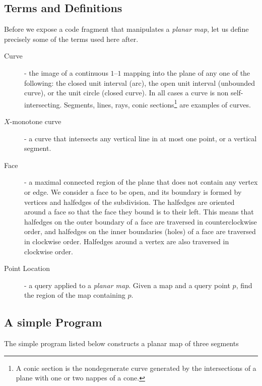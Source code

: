 \subsection{Terms and Definitions}
Before we expose a code fragment that manipulates a {\em planar
map}, let us define precisely some of the terms used here after.

\begin{description}
\item[Curve] - the image of a continuous $1$--$1$ mapping into the
plane of any one of the following: the closed unit interval (arc), the
open unit interval (unbounded curve), or the unit circle (closed
curve). In all cases a curve is non self-intersecting. Segments,
lines, rays, conic sections\footnote{A conic section is the
nondegenerate curve generated by the intersections of a plane with
one or two nappes of a cone.} are examples of curves. 

\item[{\boldmath $X$}-monotone curve] - a curve that intersects
any vertical line in at most one point, or a vertical segment.

\item[Face] - a maximal connected region of the plane that does not
contain any vertex or edge. We consider a face to be open, and its
boundary is formed by vertices and halfedges of the subdivision.
The halfedges are oriented around a face so that the face they bound 
is to their left. This means that halfedges on the outer boundary
of a face are traversed in counterclockwise order, and halfedges on
the inner boundaries (holes) of a face are traversed in clockwise
order. Halfedges around a vertex are also traversed in clockwise order. 

\item[Point Location] - a query applied to a {\em planar map}. Given a
map and a query point $p$, find the region of the map containing $p$.
\end{description}

\subsection{A simple Program}
The simple program listed below constructs a planar map of three segments

